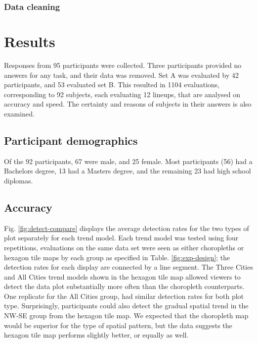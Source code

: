 \documentclass[conference,final,]{IEEEtran}
\begin{document}
\hypertarget{data-cleaning}{%
\subsubsection{Data cleaning}\label{data-cleaning}}

\hypertarget{results}{%
\section{Results}\label{results}}

Responses from 95 participants were collected. Three participants provided no answers for any task, and their data was removed. Set A was evaluated by 42 participants, and 53 evaluated set B. This resulted in 1104 evaluations, corresponding to 92 subjects, each evaluating 12 lineups, that are analysed on accuracy and speed. The certainty and reasons of subjects in their answers is also examined.

\hypertarget{participant-demographics}{%
\subsection{Participant demographics}\label{participant-demographics}}

Of the 92 participants, 67 were male, and 25 female. Most participants (56) had a Bachelors degree, 13 had a Masters degree, and the remaining 23 had high school diplomas.

\hypertarget{accuracy}{%
\subsection{Accuracy}\label{accuracy}}

Fig. \ref{fig:detect-compare} displays the average detection rates for the two types of plot separately for each trend model. Each trend model was tested using four repetitions, evaluations on the same data set were seen as either choropleths or hexagon tile maps by each group as specified in Table. \ref{fig:exp-design}; the detection rates for each display are connected by a line segment. The Three Cities and All Cities trend models shown in the hexagon tile map allowed viewers to detect the data plot substantially more often than the choropleth counterparts. One replicate for the All Cities group, had similar detection rates for both plot type. Surprisingly, participants could also detect the gradual spatial trend in the NW-SE group from the hexagon tile map. We expected that the choropleth map would be superior for the type of spatial pattern, but the data suggests the hexagon tile map performs slightly better, or equally as well.
\end{document}
